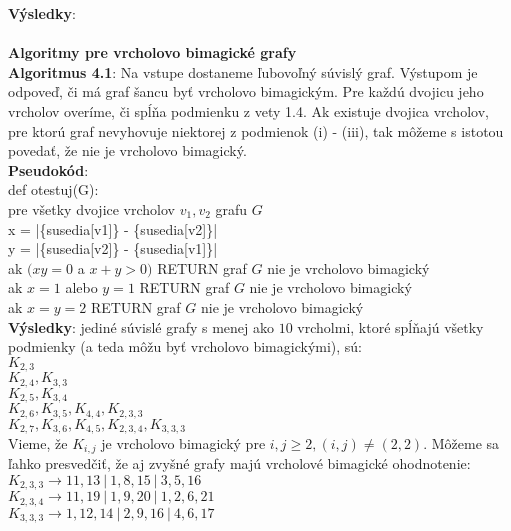 \documentclass[12pt]{article}
\begin{document}
\textbf{Výsledky}: \\\\

\textbf{Algoritmy pre vrcholovo bimagické grafy} \\
 
\textbf{Algoritmus 4.1}: Na vstupe dostaneme ľubovoľný súvislý graf. Výstupom je odpoveď, či má graf šancu byť vrcholovo bimagickým. Pre každú dvojicu jeho vrcholov overíme, či spĺňa podmienku z vety 1.4. Ak existuje dvojica vrcholov, pre ktorú graf nevyhovuje niektorej z podmienok (i) - (iii), tak môžeme s istotou povedať, že nie je vrcholovo bimagický. \\

\textbf{Pseudokód}: \\
def otestuj(G): \\
pre všetky dvojice vrcholov $v_1, v_2$ grafu $G$ \\
x = |\{susedia[v1]\} - \{susedia[v2]\}| \\
y = |\{susedia[v2]\} - \{susedia[v1]\}| \\
ak $(xy = 0$ a $x+y > 0)$ RETURN graf $G$ nie je vrcholovo bimagický \\
ak $x = 1$ alebo $y = 1$ RETURN graf $G$ nie je vrcholovo bimagický \\
ak $x = y = 2$ RETURN graf $G$ nie je vrcholovo bimagický \\

\textbf{Výsledky}: jediné súvislé grafy s menej ako $10$ vrcholmi, ktoré spĺňajú všetky podmienky (a teda môžu byť vrcholovo bimagickými), sú: \\
$K_{2,3}$ \\
$K_{2,4}, K_{3,3}$ \\
$K_{2,5}, K_{3,4}$ \\
$K_{2,6}, K_{3,5}, K_{4,4}, K_{2,3,3}$ \\
$K_{2,7}, K_{3,6}, K_{4,5}, K_{2,3,4}, K_{3,3,3}$ \\

Vieme, že $K_{i,j}$ je vrcholovo bimagický pre $i,j \geq 2, (i,j) \neq (2,2)$. Môžeme sa ľahko presvedčiť, že aj zvyšné grafy majú vrcholové bimagické ohodnotenie: \\
$K_{2,3,3} \rightarrow 11, 13 ~|~ 1, 8, 15 ~|~ 3, 5, 16$ \\
$K_{2,3,4} \rightarrow 11, 19 ~|~ 1, 9, 20 ~|~ 1, 2, 6, 21$ \\
$K_{3,3,3} \rightarrow 1, 12, 14 ~|~ 2, 9, 16 ~|~ 4, 6, 17$ \\\\
\end{document}
